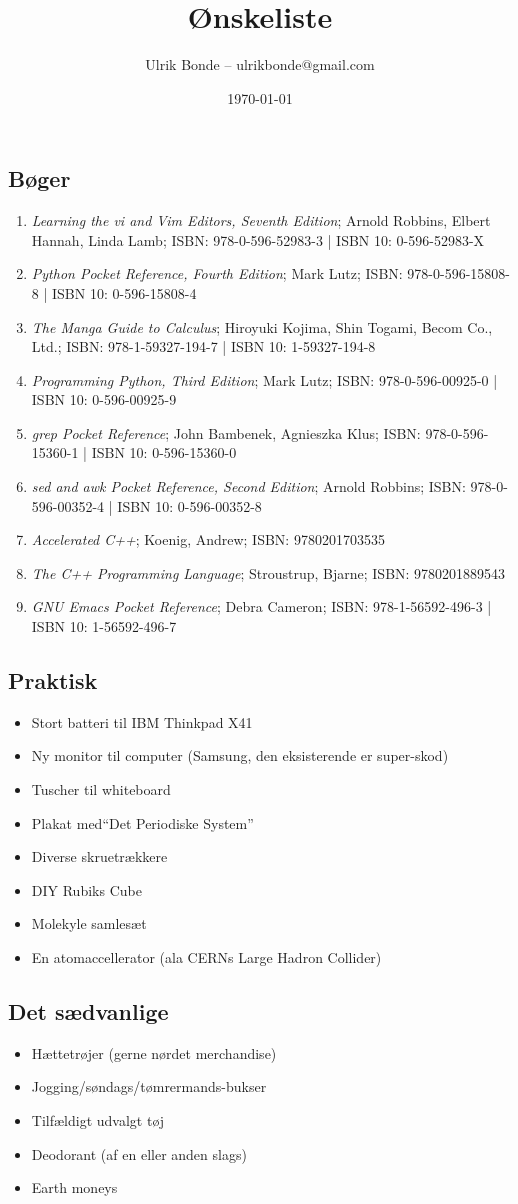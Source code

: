 \documentclass[a4paper, danish, 10pt, final]{article}
\title{Ønskeliste}
\author{Ulrik Bonde -- ulrikbonde@gmail.com}
\date{\today}
\begin{document}
\maketitle
\subsection*{Bøger}
\begin{enumerate}
    \item \emph{Learning the vi and Vim Editors, Seventh Edition}; Arnold Robbins, Elbert Hannah, Linda Lamb; ISBN: 978-0-596-52983-3 | ISBN 10: 0-596-52983-X
    \item \emph{Python Pocket Reference, Fourth Edition}; Mark Lutz; ISBN: 978-0-596-15808-8 | ISBN 10: 0-596-15808-4
    \item \emph{The Manga Guide to Calculus}; Hiroyuki Kojima, Shin Togami, Becom Co., Ltd.; ISBN: 978-1-59327-194-7 | ISBN 10: 1-59327-194-8
    \item \emph{Programming Python, Third Edition}; Mark Lutz; ISBN: 978-0-596-00925-0 | ISBN 10: 0-596-00925-9
    \item \emph{grep Pocket Reference}; John Bambenek, Agnieszka Klus; ISBN: 978-0-596-15360-1 | ISBN 10: 0-596-15360-0
    \item \emph{sed and awk Pocket Reference, Second Edition}; Arnold Robbins; ISBN: 978-0-596-00352-4 | ISBN 10: 0-596-00352-8
    \item \emph{Accelerated C++}; Koenig, Andrew; ISBN: 9780201703535
    \item \emph{The C++ Programming Language}; Stroustrup, Bjarne; ISBN: 9780201889543
    \item \emph{GNU Emacs Pocket Reference}; Debra Cameron; ISBN: 978-1-56592-496-3 | ISBN 10: 1-56592-496-7
\end{enumerate}

\subsection*{Praktisk}
\begin{itemize}
    \item Stort batteri til IBM Thinkpad X41
    \item Ny monitor til computer (Samsung, den eksisterende er super-skod)
    \item Tuscher til whiteboard
    \item Plakat med``Det Periodiske System''
    \item Diverse skruetrækkere
    \item DIY Rubiks Cube
    \item Molekyle samlesæt
    \item En atomaccellerator (ala CERNs Large Hadron Collider)
\end{itemize}

\subsection*{Det sædvanlige}
\begin{itemize}
    \item Hættetrøjer (gerne nørdet merchandise)
    \item Jogging/søndags/tømrermands-bukser
    \item Tilfældigt udvalgt tøj
    \item Deodorant (af en eller anden slags)
    \item Earth moneys
\end{itemize}
\end{document}
